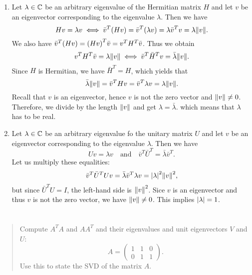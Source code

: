 \documentclass{exercise}
\begin{document}
	\begin{enumerate}
		\item Let \(\lambda \in \C\) be an arbitrary eigenvalue of the Hermitian matrix \(H\) and let \(v\) be an eigenvector corresponding to the eigenvalue \(\lambda\).
		Then we have
		\[
			Hv = \lambda v \iff \bar{v}^T \parentheses*{Hv} = \bar{v}^T \parentheses*{\lambda v} = \lambda\bar{v}^T v = \lambda\norm*{v}.
		\]
		We also have \(\bar{v}^T \parentheses*{Hv} = \parentheses*{Hv}^T \bar{v} = v^T H^T \bar{v}\).
		Thus we obtain
		\[
			v^T H^T \bar{v} = \lambda\norm*{v} \iff \bar{v}^T \bar{H}^T v = \bar{\lambda}\norm*{v}.
		\]
		Since \(H\) is Hermitian, we have \(\bar{H}^T = H\), which yields that
		\[
			\bar{\lambda}\norm*{v} = \bar{v}^T Hv = \bar{v}^T \lambda v = \lambda\norm*{v}.
		\]
		Recall that \(v\) is an eigenvector, hence \(v\) is not the zero vector and \(\norm*{v} \ne 0\).
		Therefore, we divide by the length \(\norm*{v}\) and get \(\lambda = \bar{\lambda}\). which means that \(\lambda\) has to be real.
		\item Let \(\lambda \in \C\) be an arbitrary eigenvalue fo the unitary matrix \(U\) and let \(v\) be an eigenvector corresponding to the eigenvalue \(\lambda\).
		Then we have
		\[
			Uv = \lambda v \quad \text{and} \quad \bar{v}^T \bar{U}^T = \bar{\lambda}\bar{v}^T.
		\]
		Let us multiply these equalities:
		\[
			\bar{v}^T \bar{U}^T Uv = \bar{\lambda}\bar{v}^T \lambda v = \absolute*{\lambda}^2 \norm*{v}^2,
		\]
		but since \(\bar{U}^T U = I\), the left-hand side is \(\norm*{v}^2\). Sice \(v\) is an eigenvector and thus \(v\) is not the zero vector, we have \(\norm*{v} \ne 0\). This implies \(\absolute*{\lambda} = 1\).
	\end{enumerate}


	\section{}

	\begin{quote}
		Compute \(A^T A\) and \(AA^T\) and their eigenvalues and unit eigenvectors \(V\) and \(U\):
		\begin{equation}
			A = \begin{pmatrix}
				1 & 1 & 0\\
				0 & 1 & 1
			\end{pmatrix}.
		\end{equation}
		Use this to state the SVD of the matrix \(A\).
	\end{quote}
\end{document}
